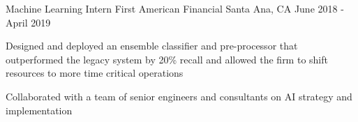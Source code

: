 \begin{cventries}

  \cventry
    {Machine Learning Intern} %
    {First American Financial} %
    {Santa Ana, CA} %
    {June 2018 - April 2019} %
    {
      \begin{cvitems} %
        \item {Designed and deployed an ensemble classifier and pre-processor that outperformed the legacy system by 20\% recall and allowed the firm to shift resources to more time critical operations}
		\item {Collaborated with a team of senior engineers and consultants on AI strategy and implementation}
      \end{cvitems}
    }

\end{cventries}




